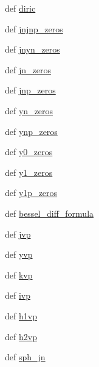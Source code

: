 \begin{DoxyCompactItemize}
\item 
def \hyperlink{namespacescipy_1_1special_1_1basic_ab44c1ec7e31d89a11c67fea0935872bc}{diric}
\item 
def \hyperlink{namespacescipy_1_1special_1_1basic_a6904de2923f16e477c353c8fa70e14ae}{jnjnp\+\_\+zeros}
\item 
def \hyperlink{namespacescipy_1_1special_1_1basic_ac89310fc1b5251a2f30592062f023d22}{jnyn\+\_\+zeros}
\item 
def \hyperlink{namespacescipy_1_1special_1_1basic_aa82477c24e71c7ab1294fa37315fcea7}{jn\+\_\+zeros}
\item 
def \hyperlink{namespacescipy_1_1special_1_1basic_a652b71f08f2a1a3620b85a32ecb311c7}{jnp\+\_\+zeros}
\item 
def \hyperlink{namespacescipy_1_1special_1_1basic_a9321e2ce6f77b4a622770bc0f460edc1}{yn\+\_\+zeros}
\item 
def \hyperlink{namespacescipy_1_1special_1_1basic_a85cd72cc30e7fdea0ae8d65bcf38d0a1}{ynp\+\_\+zeros}
\item 
def \hyperlink{namespacescipy_1_1special_1_1basic_afad241b29a298db85d9b1cbc7720ae59}{y0\+\_\+zeros}
\item 
def \hyperlink{namespacescipy_1_1special_1_1basic_a111dcc3c9b279a12db3fb782587cf824}{y1\+\_\+zeros}
\item 
def \hyperlink{namespacescipy_1_1special_1_1basic_af5387454433b720935ade7682b0169a3}{y1p\+\_\+zeros}
\item 
def \hyperlink{namespacescipy_1_1special_1_1basic_aa81f10ea120cb4b727620bb29fea4a0d}{bessel\+\_\+diff\+\_\+formula}
\item 
def \hyperlink{namespacescipy_1_1special_1_1basic_affe7b3090464518aa989d7fcf675e032}{jvp}
\item 
def \hyperlink{namespacescipy_1_1special_1_1basic_a6f1d0845e9fde471a9875b52ddb5a09b}{yvp}
\item 
def \hyperlink{namespacescipy_1_1special_1_1basic_a4f286d7b59c10a61d3d048806161fca2}{kvp}
\item 
def \hyperlink{namespacescipy_1_1special_1_1basic_afb847eb421f3beeced2581d05677bccb}{ivp}
\item 
def \hyperlink{namespacescipy_1_1special_1_1basic_a28848a3d39b7fc5857596a21360d14e4}{h1vp}
\item 
def \hyperlink{namespacescipy_1_1special_1_1basic_afbdf7ad964c2c410a6ae6762a1177c7e}{h2vp}
\item 
def \hyperlink{namespacescipy_1_1special_1_1basic_aecbf5468b1732853bcbc05df33ceedc1}{sph\+\_\+jn}

\end{DoxyCompactItemize}
